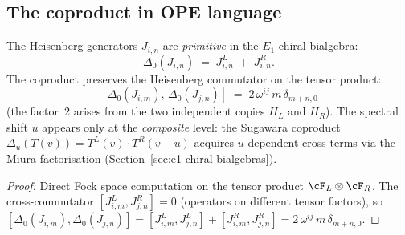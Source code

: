 \subsection{The coproduct in OPE language}
\label{subsec:coproduct-ope-language}

\begin{proposition}
\label{prop:heisenberg-primitive}
The Heisenberg generators $J_{i,n}$ are \emph{primitive} in the $E_1$-chiral bialgebra:
\begin{equation}\label{eq:heisenberg-primitive}
 \Delta_0(J_{i,n}) \;=\; J_{i,n}^L \;+\; J_{i,n}^R.
\end{equation}
The coproduct preserves the Heisenberg commutator on the tensor product:
\[
 [\Delta_0(J_{i,m}),\, \Delta_0(J_{j,n})]
 \;=\; 2\, \omega^{ij}\, m\, \delta_{m+n,0}
\]
(the factor~$2$ arises from the two independent copies $H_L$ and $H_R$). The spectral shift $u$ appears only at the \emph{composite} level: the Sugawara coproduct $\Delta_u(T(v)) = T^L(v) \cdot T^R(v - u)$ acquires $u$-dependent cross-terms via the Miura factorisation (Section~\ref{sec:e1-chiral-bialgebras}).
\end{proposition}

\begin{proof}
Direct Fock space computation on the tensor product $\cF_L \otimes \cF_R$. The cross-commutator $[J_{i,m}^L, J_{j,n}^R] = 0$ (operators on different tensor factors), so $[\Delta_0(J_{i,m}), \Delta_0(J_{j,n})] = [J_{i,m}^L, J_{j,n}^L] + [J_{i,m}^R, J_{j,n}^R] = 2\, \omega^{ij}\, m\, \delta_{m+n,0}$.
\end{proof}

